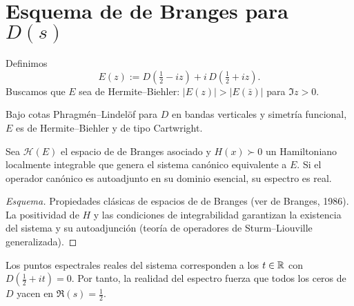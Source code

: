 \section{Esquema de de Branges para $D(s)$}

Definimos
\[
E(z):=D\!\left(\tfrac{1}{2}-iz\right)+i\,D\!\left(\tfrac{1}{2}+iz\right).
\]
Buscamos que $E$ sea de Hermite--Biehler: $|E(z)|>|E(\bar z)|$ para $\Im z>0$.

\begin{lemma}
Bajo cotas Phragmén--Lindelöf para $D$ en bandas verticales y simetría funcional,
$E$ es de Hermite--Biehler y de tipo Cartwright.
\end{lemma}

\begin{theorem}
Sea $\mathcal{H}(E)$ el espacio de de Branges asociado y $H(x)\succ 0$ un Hamiltoniano
localmente integrable que genera el sistema canónico equivalente a $E$.
Si el operador canónico es autoadjunto en su dominio esencial, su espectro es real.
\end{theorem}

\begin{proof}[Esquema]
Propiedades clásicas de espacios de de Branges (ver de Branges, 1986).
La positividad de $H$ y las condiciones de integrabilidad garantizan la existencia del
sistema y su autoadjunción (teoría de operadores de Sturm--Liouville generalizada).
\end{proof}

\begin{proposition}
Los puntos espectrales reales del sistema corresponden a los $t\in\Bbb R$ con
$D(\tfrac{1}{2}+it)=0$. Por tanto, la realidad del espectro fuerza que todos los ceros
de $D$ yacen en $\Re(s)=\tfrac{1}{2}$.
\end{proposition}
